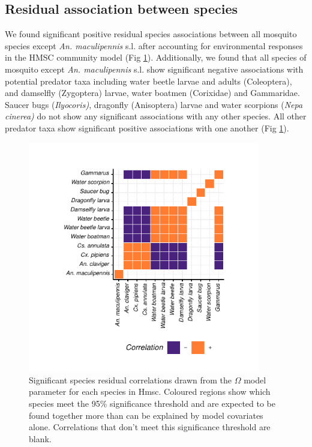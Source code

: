 \documentclass[lineno,sn-basic]{sn-jnl}%
\begin{document}
\subsection{Residual association between species}

We found significant positive residual species associations between all mosquito species except \textit{An. maculipennis} s.l. after accounting for environmental responses in the HMSC community model (Fig \ref{fig:correlation}). Additionally, we found that all species of mosquito except \textit{An. maculipennis} s.l. show significant negative associations with potential predator taxa including water beetle larvae and adults (Coleoptera), and damselfly (Zygoptera) larvae, water boatmen (Corixidae) and Gammaridae. Saucer bugs (\textit{Ilyocoris)}, dragonfly (Anisoptera) larvae and water scorpions (\textit{Nepa cinerea)} do not show any significant associations with any other species. All other predator taxa show significant positive associations with one another (Fig \ref{fig:correlation}). 

\begin{figure}[h!htbp]
\centering
\includegraphics[width=0.9\textwidth]{omega2_90.pdf}
\caption{Significant species residual correlations drawn from the $\Omega$ model parameter for each species in Hmsc. Coloured regions show which species meet the 95\% significance threshold and are expected to be found together more than can be explained by model covariates alone. Correlations that don’t meet this significance threshold are blank. }\label{fig:correlation}
\end{figure}
\end{document}

